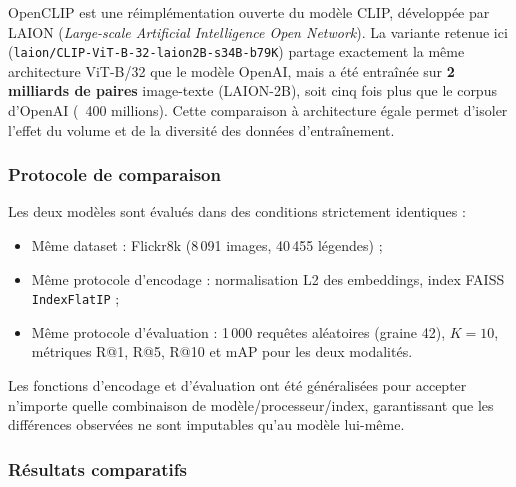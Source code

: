\documentclass[a4paper,11pt]{article}
\begin{document}
OpenCLIP est une réimplémentation ouverte du modèle CLIP, développée
par LAION (\textit{Large-scale Artificial Intelligence Open Network}).
La variante retenue ici \newline (\texttt{laion/CLIP-ViT-B-32-laion2B-s34B-b79K})
partage exactement la même architecture ViT-B/32 que le modèle OpenAI,
mais a été entraînée sur \textbf{2 milliards de paires} image-texte
(LAION-2B), soit cinq fois plus que le corpus d'OpenAI (~400 millions).
Cette comparaison à architecture égale permet d'isoler l'effet du
volume et de la diversité des données d'entraînement.
 
\subsubsection{Protocole de comparaison}
 
Les deux modèles sont évalués dans des conditions strictement identiques :
 
\begin{itemize}
    \item Même dataset : Flickr8k (8\,091 images, 40\,455 légendes) ;
    \item Même protocole d'encodage : normalisation L2 des embeddings,
          index FAISS \texttt{IndexFlatIP} ;
    \item Même protocole d'évaluation : 1\,000 requêtes aléatoires
          (graine 42), $K = 10$, métriques R@1, R@5, R@10 et mAP
          pour les deux modalités.
\end{itemize}
 
Les fonctions d'encodage et d'évaluation ont été généralisées pour
accepter n'importe quelle combinaison de modèle/processeur/index,
garantissant que les différences observées ne sont imputables qu'au
modèle lui-même.
 
\subsubsection{Résultats comparatifs}
 
\begin{table}[h]
\centering
\caption{Comparaison CLIP ViT-B/32 (OpenAI) vs OpenCLIP ViT-B/32 (LAION-2B) sur Flickr8k}
\label{tab:openclip_comparison}
\end{table}
\end{document}

